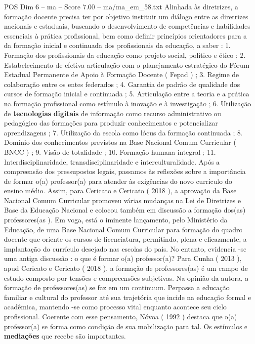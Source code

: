 \begin{textsample}{POS Dim 6 – ma – Score 7.00 – ma/ma\_em\_58.txt}
Alinhada às diretrizes, a formação docente precisa ter por objetivo instituir um diálogo entre as diretrizes nacionais e estaduais, buscando o desenvolvimento de competências e habilidades essenciais à prática profissional, bem como definir princípios orientadores para a da formação inicial e continuada dos profissionais da educação, a saber : 1.
Formação dos profissionais da educação como projeto social, político e ético ; 2.
Estabelecimento de efetiva articulação com o planejamento estratégico do Fórum Estadual Permanente de Apoio à Formação Docente ( Fepad ) ; 3.
Regime de colaboração entre os entes federados ; 4.
Garantia de padrão de qualidade dos cursos de formação inicial e continuada ; 5.
Articulação entre a teoria e a prática na formação profissional como estímulo à inovação e à investigação ; 6.
Utilização de \textbf{tecnologias} \textbf{digitais} de informação como recurso administrativo ou pedagógico das formações para produzir conhecimentos e potencializar aprendizagens ; 7.
Utilização da escola como lócus da formação continuada ; 8.
Domínio dos conhecimentos previstos na Base Nacional Comum Curricular ( BNCC ) ; 9.
Visão de totalidade ; 10.
Formação humana integral ; 11.
Interdisciplinaridade, transdisciplinaridade e interculturalidade.
Após a compreensão dos pressupostos legais, passamos às reflexões sobre a importância de formar o(a) professor(a) para atender às exigências do novo currículo do ensino médio.
Assim, para Cericato e Cericato ( 2018 ), a aprovação da Base Nacional Comum Curricular promoveu várias mudanças na Lei de Diretrizes e Base da Educação Nacional e colocou também em discussão a formação dos(as) professores(as ).
Em voga, está o iminente lançamento, pelo Ministério da Educação, de uma Base Nacional Comum Curricular para formação do quadro docente que oriente os cursos de licenciatura, permitindo, plena e eficazmente, a implantação do currículo desejado nas escolas do país.
No entanto, evidencia -se uma antiga discussão : o que é formar o(a) professor(a)?
Para Cunha ( 2013 ), apud Cericato e Cericato ( 2018 ), a formação de professores(as) é um campo de estudo composto por tensões e compreensões subjetivas.
Na opinião da autora, a formação de professores(as) se faz em um continuum.
Perpassa a educação familiar e cultural do professor até sua trajetória que incide na educação formal e acadêmica, mantendo -se como processo vital enquanto acontece seu ciclo profissional.
Coerente com esse pensamento, Nóvoa ( 1992 ) destaca que o(a) professor(a) se forma como condição de sua mobilização para tal.
Os estímulos e \textbf{mediações} que recebe são importantes.

\end{textsample}
